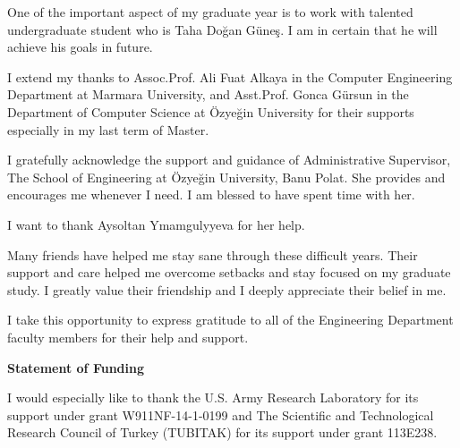 \documentclass[a4,12pt]{ozu-thesis}
\begin{document}
\begin{preliminary}
\begin{acknowledgements}
One of the important aspect of my graduate year is to work with talented undergraduate student who is Taha Do\u{g}an G\"{u}ne\c{s}. I am in certain that he will achieve his goals in future.

I extend my thanks to Assoc.Prof. Ali Fuat Alkaya in the Computer Engineering Department at Marmara University, and Asst.Prof. Gonca G\"{u}rsun in the Department of Computer Science at \"{O}zye\u{g}in University for their supports especially in my last term of Master. 

I gratefully acknowledge the support and guidance of Administrative Supervisor, The School of Engineering at \"{O}zye\u{g}in University, Banu Polat. She provides and encourages me whenever I need. I am blessed to have spent time with her.

I want to thank Aysoltan Ymamgulyyeva for her help.

Many friends have helped me stay sane through these difficult years. Their support and care helped me overcome setbacks and stay focused on my graduate study. I greatly value their friendship and I deeply appreciate their belief in me.

I take this opportunity to express gratitude to all of the Engineering Department faculty members for their help and support.

\newpage
\textbf{Statement of Funding}

I would especially like to thank the U.S. Army Research Laboratory for its support under grant W911NF-14-1-0199 and The Scientific and Technological Research Council of Turkey (TUBITAK) for its support under grant 113E238. 


\end{acknowledgements}


\contents

\thispagestyle{empty}


\begin{abbrv}



\end{abbrv}
\end{preliminary}
\end{document}
